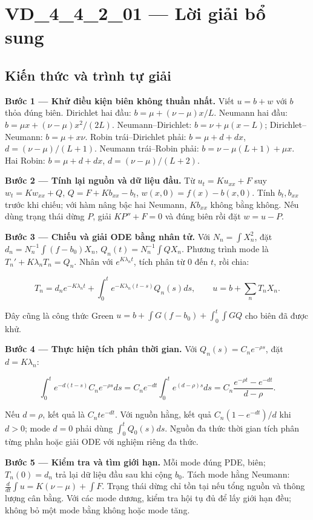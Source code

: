 \documentclass[10pt,a4paper]{article}
\begin{document}
\section*{VD\_4\_4\_2\_01 — Lời giải bổ sung}
\subsection*{Kiến thức và trình tự giải}
\textbf{Bước 1 — Khử điều kiện biên không thuần nhất.} Viết $u=b+w$ với $b$ thỏa đúng biên. Dirichlet hai đầu: $b=\mu+(\nu-\mu)x/L$. Neumann hai đầu: $b=\mu x+(\nu-\mu)x^2/(2L)$. Neumann–Dirichlet: $b=\nu+\mu(x-L)$; Dirichlet–Neumann: $b=\mu+x\nu$. Robin trái–Dirichlet phải: $b=\mu+d+dx$, $d=(\nu-\mu)/(L+1)$. Neumann trái–Robin phải: $b=\nu-\mu(L+1)+\mu x$. Hai Robin: $b=\mu+d+dx$, $d=(\nu-\mu)/(L+2)$.

\textbf{Bước 2 — Tính lại nguồn và dữ liệu đầu.} Từ $u_t=Ku_{xx}+F$ suy $w_t=Kw_{xx}+Q$, $Q=F+Kb_{xx}-b_t$, $w(x,0)=f(x)-b(x,0)$. Tính $b_t,b_{xx}$ trước khi chiếu; với hàm nâng bậc hai Neumann, $Kb_{xx}$ không bằng không. Nếu dùng trạng thái dừng $P$, giải $KP''+F=0$ và đúng biên rồi đặt $w=u-P$.

\textbf{Bước 3 — Chiếu và giải ODE bằng nhân tử.} Với $N_n=\int X_n^2$, đặt $d_n=N_n^{-1}\int(f-b_0)X_n$, $Q_n(t)=N_n^{-1}\int QX_n$. Phương trình mode là $T_n'+K\lambda_nT_n=Q_n$. Nhân với $e^{K\lambda_nt}$, tích phân từ $0$ đến $t$, rồi chia:


\[
T_n=d_ne^{-K\lambda_nt}+\int_0^te^{-K\lambda_n(t-s)}Q_n(s)ds,\qquad
u=b+\sum_nT_nX_n.
\]


Đây cũng là công thức Green $u=b+\int G(f-b_0)+\int_0^t\int GQ$ cho biên đã được khử.

\textbf{Bước 4 — Thực hiện tích phân thời gian.} Với $Q_n(s)=C_ne^{-\rho s}$, đặt $d=K\lambda_n$:


\[
\int_0^te^{-d(t-s)}C_ne^{-\rho s}ds
=C_ne^{-dt}\int_0^te^{(d-\rho)s}ds
=C_n\frac{e^{-\rho t}-e^{-dt}}{d-\rho}.
\]


Nếu $d=\rho$, kết quả là $C_nte^{-dt}$. Với nguồn hằng, kết quả $C_n(1-e^{-dt})/d$ khi $d>0$; mode $d=0$ phải dùng $\int_0^tQ_0(s)ds$. Nguồn đa thức thời gian tích phân từng phần hoặc giải ODE với nghiệm riêng đa thức.

\textbf{Bước 5 — Kiểm tra và tìm giới hạn.} Mỗi mode đúng PDE, biên; $T_n(0)=d_n$ trả lại dữ liệu đầu sau khi cộng $b_0$. Tách mode hằng Neumann: $\frac d{dt}\int u=K(\nu-\mu)+\int F$. Trạng thái dừng chỉ tồn tại nếu tổng nguồn và thông lượng cân bằng. Với các mode dương, kiểm tra hội tụ đủ để lấy giới hạn đều; không bỏ một mode bằng không hoặc mode tăng.
\end{document}
